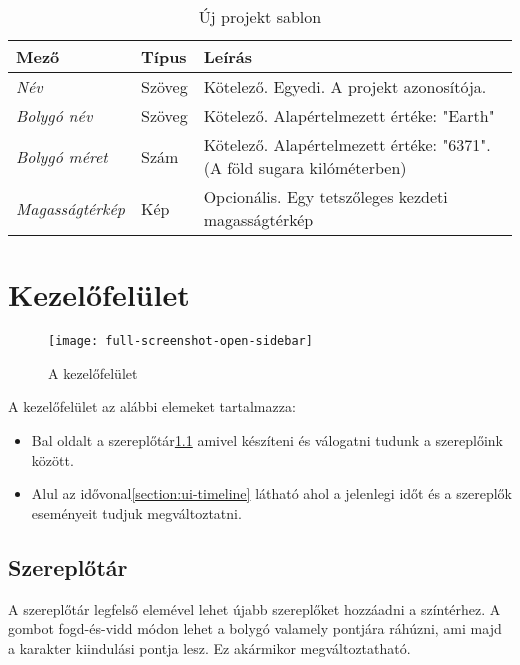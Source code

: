 \begin{table}[H]
	\centering
	\begin{tabular}{ | m{} | m{} | m{} | }
		\hline
		\textbf{Mező} & \textbf{Típus} & \textbf{Leírás} \\
		\hline \hline
		\emph{Név} & Szöveg & Kötelező. Egyedi. A projekt azonosítója. \\
		\hline
		\emph{Bolygó név} & Szöveg & Kötelező. Alapértelmezett értéke: "Earth" \\
		\hline
		\emph{Bolygó méret} & Szám & Kötelező. Alapértelmezett értéke: "6371". (A föld sugara kilóméterben)  \\
		\hline
		\emph{Magasságtérkép} & Kép & Opcionális. Egy tetszőleges kezdeti magasságtérkép  \\
		\hline
	\end{tabular}
	\caption{Új projekt sablon}
	\label{tab:create-project-form}
\end{table}


\section{Kezelőfelület} \label{section:ui}

\begin{figure}[h!]
	\centering
	\texttt{[image: full-screenshot-open-sidebar]}
	\caption{
		A kezelőfelület}
	\label{fig:full-screenshot-open-sidebar}
\end{figure}

A kezelőfelület az alábbi elemeket tartalmazza:

\begin{itemize}
	\item Bal oldalt a szereplőtár\cref{section:ui-actor-tool} amivel készíteni és válogatni tudunk a szereplőink között.
	\item Alul az idővonal\cref{section:ui-timeline} látható ahol a jelenlegi időt és a szereplők eseményeit tudjuk megváltoztatni.
\end{itemize}

\subsection{Szereplőtár} \label{section:ui-actor-tool}

A szereplőtár legfelső elemével lehet újabb szereplőket hozzáadni a színtérhez. A gombot fogd-és-vidd módon lehet a bolygó valamely pontjára ráhúzni, ami majd a karakter kiindulási pontja lesz. Ez akármikor megváltoztatható.

